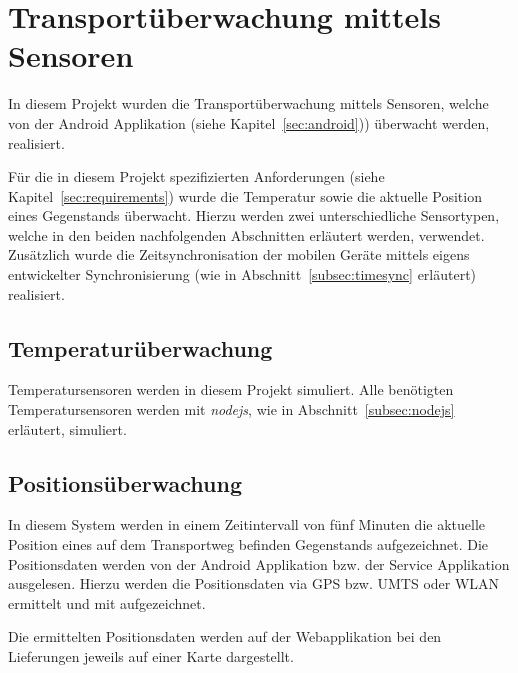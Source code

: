 \section{Transportüberwachung mittels Sensoren}\label{sensors}
\label{sec:sensors}

In diesem Projekt wurden die Transportüberwachung mittels Sensoren, welche
	von der Android Applikation (siehe Kapitel~\ref{sec:android})) überwacht
	werden, realisiert.
	
Für die in diesem Projekt spezifizierten Anforderungen (siehe Kapitel~\ref{sec:requirements})
	wurde die Temperatur sowie die aktuelle Position eines Gegenstands überwacht. Hierzu
	werden zwei unterschiedliche Sensortypen, welche in den beiden nachfolgenden Abschnitten
	erläutert werden, verwendet. Zusätzlich wurde die Zeitsynchronisation der mobilen Geräte
	mittels eigens entwickelter Synchronisierung (wie in Abschnitt~\ref{subsec:timesync}
	erläutert) realisiert.

\subsection{Temperaturüberwachung}

Temperatursensoren werden in diesem Projekt simuliert. Alle benötigten
	Temperatursensoren werden mit \emph{nodejs}, wie in
	Abschnitt~\ref{subsec:nodejs} erläutert, simuliert.

\subsection{Positionsüberwachung}

In diesem System werden in einem Zeitintervall von fünf Minuten die aktuelle
	Position eines auf dem Transportweg befinden Gegenstands aufgezeichnet.
	Die Positionsdaten werden von der Android Applikation bzw. der Service
	Applikation ausgelesen. Hierzu werden die Positionsdaten via GPS bzw. UMTS
	oder WLAN ermittelt und mit aufgezeichnet.
	
Die ermittelten Positionsdaten werden auf der Webapplikation bei den Lieferungen
	jeweils auf einer Karte dargestellt.